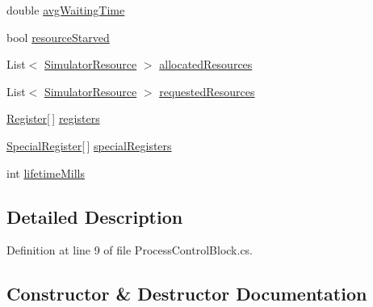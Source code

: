 \begin{DoxyCompactItemize}
\item 
double \hyperlink{class_c_p_u___o_s___simulator_1_1_operating___system_1_1_process_control_block_ab2aadabc87960312728806d747db342c}{avg\+Waiting\+Time}
\item 
bool \hyperlink{class_c_p_u___o_s___simulator_1_1_operating___system_1_1_process_control_block_a78ae58aafcca78f88f6c4a979186d45e}{resource\+Starved}
\item 
List$<$ \hyperlink{class_c_p_u___o_s___simulator_1_1_operating___system_1_1_simulator_resource}{Simulator\+Resource} $>$ \hyperlink{class_c_p_u___o_s___simulator_1_1_operating___system_1_1_process_control_block_ab485d0caecc696b77ad5affbd5bba1cd}{allocated\+Resources}
\item 
List$<$ \hyperlink{class_c_p_u___o_s___simulator_1_1_operating___system_1_1_simulator_resource}{Simulator\+Resource} $>$ \hyperlink{class_c_p_u___o_s___simulator_1_1_operating___system_1_1_process_control_block_a579ef3ff031915bcd7ed857547be7311}{requested\+Resources}
\item 
\hyperlink{class_c_p_u___o_s___simulator_1_1_c_p_u_1_1_register}{Register}\mbox{[}$\,$\mbox{]} \hyperlink{class_c_p_u___o_s___simulator_1_1_operating___system_1_1_process_control_block_abf1ea0cffc667a8119d25d8a9c283483}{registers}
\item 
\hyperlink{class_c_p_u___o_s___simulator_1_1_c_p_u_1_1_special_register}{Special\+Register}\mbox{[}$\,$\mbox{]} \hyperlink{class_c_p_u___o_s___simulator_1_1_operating___system_1_1_process_control_block_a1e39a81f5ee1a47350ee3a77cf331646}{special\+Registers}
\item 
int \hyperlink{class_c_p_u___o_s___simulator_1_1_operating___system_1_1_process_control_block_a31259298bf00ca63f7a9f879f0e67c45}{lifetime\+Mills}
\end{DoxyCompactItemize}


\subsection{Detailed Description}


Definition at line 9 of file Process\+Control\+Block.\+cs.



\subsection{Constructor \& Destructor Documentation}
\hypertarget{class_c_p_u___o_s___simulator_1_1_operating___system_1_1_process_control_block_a8af7f052d1a03e35f7298407df2055e7}{}
